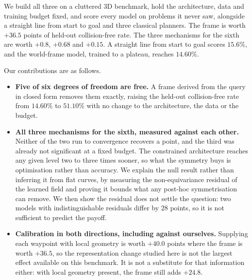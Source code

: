 \documentclass[10pt,twocolumn,letterpaper]{article}
\begin{document}
We build all three on a cluttered 3D benchmark, hold the architecture, data and
training budget fixed, and score every model on problems it never saw,
alongside a straight line from start to goal and three classical planners. The frame is worth
$+36.5$ points of held-out collision-free rate. The three mechanisms for the
sixth are worth $+0.8$, $+0.68$ and $+0.15$. A straight line from start to goal
scores $15.6\%$, and the world-frame model, trained to a plateau, reaches
$14.60\%$.

Our contributions are as follows.

\begin{itemize}\itemsep2pt
  \item \textbf{Five of six degrees of freedom are free.} A frame derived from
  the query in closed form removes them exactly, raising the held-out
  collision-free rate from $14.60\%$ to $51.10\%$ with no change to the architecture, the data or the budget.

  \item \textbf{All three mechanisms for the sixth, measured against each
  other.} Neither of the two run to convergence recovers a point, and the third
was already not significant at a fixed budget. The constrained architecture
  reaches any given level two to three times sooner, so what the symmetry buys is
  optimisation rather than accuracy. We explain the null result rather than
  inferring it from
  flat curves, by measuring the non-equivariance residual of the learned field
  and proving it bounds what any post-hoc symmetrisation can remove. We then show
  the residual does not settle the question: two models with indistinguishable
  residuals differ by $28$ points, so it is not sufficient to predict the
  payoff.

  \item \textbf{Calibration in both directions, including against ourselves.}
  Supplying each waypoint with local geometry is worth $+40.0$ points where the
  frame is worth $+36.5$, so the representation change studied here is not the
  largest effect available on this benchmark. It is not a substitute for that
  information either: with local geometry present, the frame still adds $+24.8$.
\end{itemize}
\end{document}

